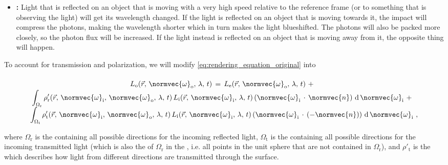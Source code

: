 {\begin{itemize}
\item \textbf{:} Light that is reflected on an object that is moving with a very high speed relative to the reference frame (or to something that is observing the light) will get its wavelength changed. If the light is reflected on an object that is moving towards it, the impact will compress the photons, making the wavelength shorter which in turn makes the light blueshifted. The photons will also be packed more closely, so the photon flux will be increased. If the light instead is reflected on an object that is moving away from it, the opposite thing will happen.
\end{itemize}

To account for transmission and polarization, we will modify \eqref{eq:rendering_equation_original} into

\begin{equation} \label{eq:rendering_equation_improved}
\renewcommand*{\arraystretch}{1.5}
\begin{array}{cl}
L_{\text{o}}(\vec{r},\,\normvec{\omega}_{\text{o}},\, \lambda,\, t) \,=\, L_{\text{e}}(\vec{r},\, \normvec{\omega}_{\text{o}},\, \lambda,\, t) \ + \\
\displaystyle \int_{\Omega_{\text{r}}} \rho'_{\text{r}}(\vec{r},\, \normvec{\omega}_{\text{i}},\, \normvec{\omega}_{\text{o}},\, \lambda,\, t)\, L_{\text{i}}(\vec{r},\, \normvec{\omega}_{\text{i}},\, \lambda,\, t)\, (\normvec{\omega}_{\text{i}}\,\cdot\,\normvec{n})\, \operatorname d \normvec{\omega}_{\text{i}} \ + \\
\displaystyle \int_{\Omega_{\text{t}}} \rho'_{\text{t}}(\vec{r},\, \normvec{\omega}_{\text{i}},\, \normvec{\omega}_{\text{o}},\, \lambda,\, t)\, L_{\text{i}}(\vec{r},\, \normvec{\omega}_{\text{i}},\, \lambda,\, t)\, (\normvec{\omega}_{\text{i}}\,\cdot\,(-\normvec{n}))\, \operatorname d \normvec{\omega}_{\text{i}} & \!\!\!\! ,
\end{array}
\end{equation}

where $\Omega_{\text{r}}$ is the  containing all possible directions for the incoming reflected light, $\Omega_{\text{t}}$ is the  containing all possible directions for the incoming transmitted light (which is also the  of $\Omega_{\text{r}}$ in the , i.e. all points in the unit sphere that are not contained in $\Omega_{\text{r}}$), and $\rho'_{\text{t}}$ is the \BTDF which describes how light from different directions are transmitted through the surface.

}
